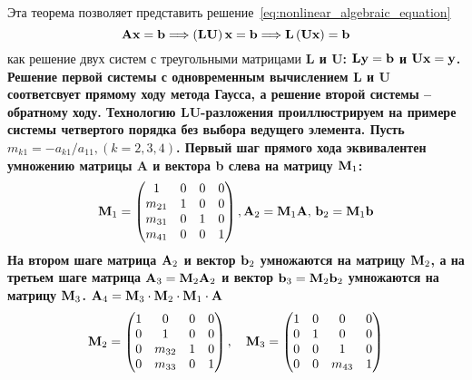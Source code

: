 \documentclass[../../calc-math-exam-2023.tex]{subfiles}
\begin{document}
    Эта теорема позволяет представить решение~\eqref{eq:nonlinear_algebraic_equation}
    \begin{equation*}
        \bf{A}\bf{x} = \bf{b} \Longrightarrow \left( \bf{L}\bf{U} \right)\bf{x} = \bf{b} \Longrightarrow \bf{L}\left( \bf{U}\bf{x} \right) = \bf{b}
    \end{equation*}
    как решение двух систем с треугольными матрицами \bf{L} и \bf{U}: $\bf{L}\bf{y} = \bf{b}$ и $\bf{U}\bf{x} = \bf{y}$.
    Решение первой системы с одновременным вычислением \bf{L} и \bf{U} соответсвует прямому ходу метода Гаусса, а решение
    второй системы -- обратному ходу. Технологию \bf{LU}-разложения проиллюстрируем на примере системы четвертого
    порядка без выбора ведущего элемента. Пусть $\displaystyle m_{k1} = -a_{k1}/a_{11}, (k = 2, 3, 4)$. Первый шаг
    прямого хода эквивалентен умножению матрицы \bf{A} и вектора \bf{b} слева на матрицу $\bf{M}_1$:
    \begin{equation*}
        \bf{M}_1 =
        \begin{pmatrix}
            1      & 0 & 0 & 0 \\
            m_{21} & 1 & 0 & 0 \\
            m_{31} & 0 & 1 & 0 \\
            m_{41} & 0 & 0 & 1
        \end{pmatrix},
        \bf{A}_2 = \bf{M}_1 \bf{A}, \, \bf{b}_2 = \bf{M}_1 \bf{b}
    \end{equation*}
    На втором шаге матрица $\bf{A}_2$ и вектор $\bf{b}_2$ умножаются на матрицу $\bf{M}_2$, а на третьем шаге матрица
    $\bf{A}_3 = \bf{M}_2 \bf{A}_2$ и вектор $\bf{b}_3 = \bf{M}_2 \bf{b}_2 $ умножаются на матрицу $\bf{M}_3$.
    $\bf{A}_4 = \bf{M}_3 \cdot \bf{M}_2 \cdot \bf{M}_1 \cdot \bf{A}$
    \begin{equation*}
        \bf{M}_2 =
        \begin{pmatrix}
            1 & 0      & 0 & 0 \\
            0 & 1      & 0 & 0 \\
            0 & m_{32} & 1 & 0 \\
            0 & m_{33} & 0 & 1
        \end{pmatrix},
        \quad \bf{M}_3 =
        \begin{pmatrix}
            1 & 0 & 0      & 0 \\
            0 & 1 & 0      & 0 \\
            0 & 0 & 1      & 0 \\
            0 & 0 & m_{43} & 1
        \end{pmatrix}
    \end{equation*}
\end{document}
